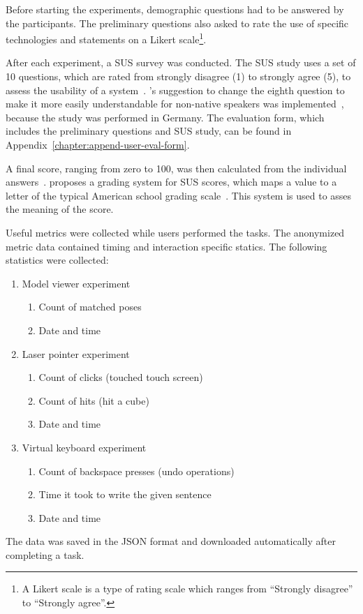 Before starting the experiments, demographic questions had to be answered by the participants. The preliminary questions also asked to rate the use of specific technologies and statements on a Likert scale\footnote{A Likert scale is a type of rating scale which ranges from \enquote{Strongly disagree} to \enquote{Strongly agree}.}. 

After each experiment, a \gls{SUS} survey was conducted. The \gls{SUS} study uses a set of 10 questions, which are rated from strongly disagree (1) to strongly agree (5), to assess the usability of a system~\cite[3]{Brooke.1996}. \citeauthor{Finstad.2006}'s suggestion to change the eighth question to make it more easily understandable for non-native speakers was implemented~\cite[188]{Finstad.2006}, because the study was performed in Germany. The evaluation form, which includes the preliminary questions and \gls{SUS} study, can be found in Appendix~\ref{chapter:append-user-eval-form}.

A final score, ranging from zero to 100, was then calculated from the individual answers~\cite{Brooke.1996}. \citeauthor{Bangor.2009} proposes a grading system for \gls{SUS} scores, which maps a value to a letter of the typical American school grading scale~\cite{Bangor.2009}. This system is used to asses the meaning of the score.

Useful metrics were collected while users performed the tasks. The anonymized metric data contained timing and interaction specific statics. The following statistics were collected:
\begin{enumerate}
  \item Model viewer experiment
  \begin{enumerate}
    \item Count of matched poses
    \item Date and time
  \end{enumerate}

  \item Laser pointer experiment
  \begin{enumerate}
    \item Count of clicks (touched touch screen)
    \item Count of hits (hit a cube)
    \item Date and time
  \end{enumerate}
  
  \item Virtual keyboard experiment
  \begin{enumerate}
    \item Count of backspace presses (undo operations)
    \item Time it took to write the given sentence
    \item Date and time
  \end{enumerate}
\end{enumerate}
The data was saved in the JSON format and downloaded automatically after completing a task.